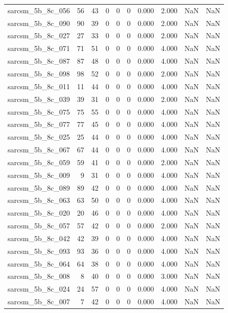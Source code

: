 \documentclass{article}
\begin{document}
\begin{longtable}{lrrrrrrrrr}
sarcsm\_5b\_8c\_056 & 56 & 43 & 0 & 0 & 0 & 0.000 & 2.000 & NaN & NaN \\
sarcsm\_5b\_8c\_090 & 90 & 39 & 0 & 0 & 0 & 0.000 & 2.000 & NaN & NaN \\
sarcsm\_5b\_8c\_027 & 27 & 33 & 0 & 0 & 0 & 0.000 & 2.000 & NaN & NaN \\
sarcsm\_5b\_8c\_071 & 71 & 51 & 0 & 0 & 0 & 0.000 & 4.000 & NaN & NaN \\
sarcsm\_5b\_8c\_087 & 87 & 48 & 0 & 0 & 0 & 0.000 & 4.000 & NaN & NaN \\
sarcsm\_5b\_8c\_098 & 98 & 52 & 0 & 0 & 0 & 0.000 & 2.000 & NaN & NaN \\
sarcsm\_5b\_8c\_011 & 11 & 44 & 0 & 0 & 0 & 0.000 & 4.000 & NaN & NaN \\
sarcsm\_5b\_8c\_039 & 39 & 31 & 0 & 0 & 0 & 0.000 & 2.000 & NaN & NaN \\
sarcsm\_5b\_8c\_075 & 75 & 55 & 0 & 0 & 0 & 0.000 & 4.000 & NaN & NaN \\
sarcsm\_5b\_8c\_077 & 77 & 45 & 0 & 0 & 0 & 0.000 & 4.000 & NaN & NaN \\
sarcsm\_5b\_8c\_025 & 25 & 44 & 0 & 0 & 0 & 0.000 & 4.000 & NaN & NaN \\
sarcsm\_5b\_8c\_067 & 67 & 44 & 0 & 0 & 0 & 0.000 & 4.000 & NaN & NaN \\
sarcsm\_5b\_8c\_059 & 59 & 41 & 0 & 0 & 0 & 0.000 & 2.000 & NaN & NaN \\
sarcsm\_5b\_8c\_009 & 9 & 31 & 0 & 0 & 0 & 0.000 & 4.000 & NaN & NaN \\
sarcsm\_5b\_8c\_089 & 89 & 42 & 0 & 0 & 0 & 0.000 & 4.000 & NaN & NaN \\
sarcsm\_5b\_8c\_063 & 63 & 50 & 0 & 0 & 0 & 0.000 & 4.000 & NaN & NaN \\
sarcsm\_5b\_8c\_020 & 20 & 46 & 0 & 0 & 0 & 0.000 & 4.000 & NaN & NaN \\
sarcsm\_5b\_8c\_057 & 57 & 42 & 0 & 0 & 0 & 0.000 & 2.000 & NaN & NaN \\
sarcsm\_5b\_8c\_042 & 42 & 39 & 0 & 0 & 0 & 0.000 & 4.000 & NaN & NaN \\
sarcsm\_5b\_8c\_093 & 93 & 36 & 0 & 0 & 0 & 0.000 & 4.000 & NaN & NaN \\
sarcsm\_5b\_8c\_064 & 64 & 38 & 0 & 0 & 0 & 0.000 & 4.000 & NaN & NaN \\
sarcsm\_5b\_8c\_008 & 8 & 40 & 0 & 0 & 0 & 0.000 & 3.000 & NaN & NaN \\
sarcsm\_5b\_8c\_024 & 24 & 57 & 0 & 0 & 0 & 0.000 & 4.000 & NaN & NaN \\
sarcsm\_5b\_8c\_007 & 7 & 42 & 0 & 0 & 0 & 0.000 & 4.000 & NaN & NaN \\

\end{longtable}
\end{document}

